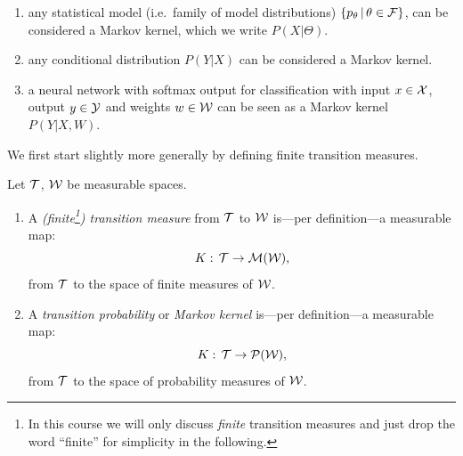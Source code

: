 \begin{Eg}
    \begin{enumerate}
        \item any statistical model (i.e.\ family of model distributions) $\{p_\theta \,|\, \theta \in \mathcal{F}\}$, can 
            be considered a Markov kernel, which we write $P(X|\Theta)$.
        \item any conditional distribution $P(Y|X)$ can be considered a Markov kernel.
        \item a neural network with softmax output for classification with 
            input $x \in \mathcal{X}$, output $y \in \mathcal{Y}$ and weights $w \in \mathcal{W}$ can be seen as a Markov kernel $P(Y|X,W)$.

    \end{enumerate}
\end{Eg}


We first start slightly more generally by defining finite transition measures.

\begin{Def}
    \label{def-transition-measure}
    Let $\mathcal{T}$, $\mathcal{W}$ be measurable spaces.
    \begin{enumerate}
        \item A \emph{(finite\footnote{In this course we will only discuss \emph{finite} transition measures and just drop the word ``finite'' for simplicity in the following.}) transition measure}  from $\mathcal{T}$ to $\mathcal{W}$
    is---per definition---a measurable map:
    \[ K:\, \mathcal{T} \to \mathcal{M}(\mathcal{W}), \]
        from $\mathcal{T}$ to the space of finite measures of $\mathcal{W}$.
    \item A \emph{transition probability} or \emph{Markov kernel} is---per definition---a measurable map:
    \[ K:\, \mathcal{T} \to \mathcal{P}(\mathcal{W}), \]
    from $\mathcal{T}$ to the space of probability measures of $\mathcal{W}$.
    \end{enumerate}
\end{Def}

